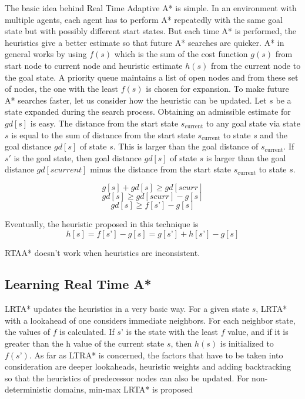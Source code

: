 \documentclass[tog]{acmsiggraph}
\begin{document}
The basic idea behind Real Time Adaptive A* is simple. In an
environment with multiple agents, each agent has to perform A*
repeatedly with the same goal state but with possibly different start
states. But each time A* is performed, the heuristics give a better
estimate so that future A* searches are quicker. A* in general works
by using \(f(s)\) which is the sum of the cost function \(g(s)\) from
start node to current node and heuristic estimate \(h(s)\) from the
current node to the goal state. A priority queue maintains a list of
open nodes and from these set of nodes, the one with the least
\(f(s)\) is chosen for expansion. To make future A* searches faster,
let us consider how the heuristic can be updated. Let \(s\) be a state
expanded during the search process. Obtaining an admissible estimate
for \(gd[s]\) is easy. The distance from the start state
\(s_\text{current}\) to any goal state via state \(s\) is equal to the
sum of distance from the start state \(s_\text{current}\) to state
\(s\) and the goal distance \(gd[s]\) of state \(s\). This is larger
than the goal distance of \(s_\text{current}\). If \(s'\) is the goal
state, then goal distance \(gd[s]\) of state \(s\) is larger than the
goal distance \(gd[scurrent]\) minus the distance from the start state
\(s_\text{current}\) to state \(s\).

\[ g[s] + gd[s] ≥ gd[scurr] \]
\[ gd[s] ≥ gd[scurr] − g[s] \]
\[ gd[s] ≥ f[s’] − g[s] \]

Eventually, the heuristic proposed in this technique is
\[ h[s] = f[s’] − g[s] = g[s’] + h[s’] − g[s] \]


RTAA* doesn’t work when heuristics are inconsistent.  

\subsection{Learning Real Time A*}

LRTA* updates the heuristics in a very basic way. For a given state
\(s\), LRTA* with a lookahead of one considers immediate neighbors.
For each neighbor state, the values of \(f\) is calculated. If \(s’\)
is the state with the least \(f\) value, and if it is greater than the
h value of the current state \(s\), then \(h(s)\) is initialized to
\(f(s’)\). As far as LTRA* is concerned, the factors that have to be
taken into consideration are deeper lookaheads, heuristic weights and
adding backtracking so that the heuristics of predecessor nodes can
also be updated. For non-deterministic domains, min-max LRTA* is
proposed

\end{document}
